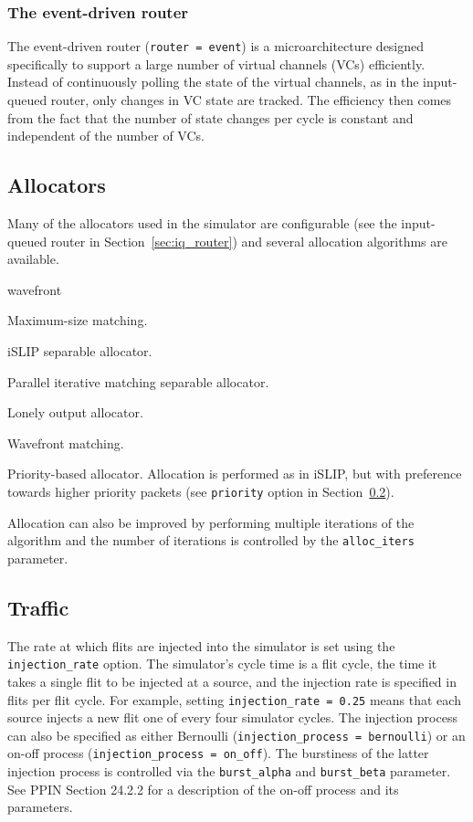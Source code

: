 \documentclass[11pt]{article}
\begin{document}
\subsubsection{The event-driven router}
\label{sec:event_router}

The event-driven router (\texttt{router = event}) is a
microarchitecture designed specifically to support a large number of
virtual channels (VCs) efficiently.  Instead of continuously polling
the state of the virtual channels, as in the input-queued router, only
changes in VC state are tracked.  The efficiency then comes from the
fact that the number of state changes per cycle is constant and
independent of the number of VCs.

\subsection{Allocators}
\label{sec:alloc}

Many of the allocators used in the simulator are configurable (see
the input-queued router in Section~\ref{sec:iq_router}) and several
allocation algorithms are available.
\begin{opt_list}{wavefront}

\item[max\_size] Maximum-size matching. 
\item[islip] iSLIP separable allocator.
\item[pim] Parallel iterative matching separable allocator.
\item[loa] Lonely output allocator.
\item[wavefront] Wavefront matching.
\item[select] Priority-based allocator.  Allocation is performed as in
iSLIP, but with preference towards higher priority packets (see
\texttt{priority} option in Section~\ref{sec:traffic}).

\end{opt_list}

Allocation can also be improved by performing multiple iterations of
the algorithm and the number of iterations is controlled by the
\texttt{alloc\_iters} parameter.

\subsection{Traffic}
\label{sec:traffic}

The rate at which flits are injected into the simulator is set using
the \texttt{injection\_rate} option.  The simulator's cycle time is a
flit cycle, the time it takes a single flit to be injected at a
source, and the injection rate is specified in flits per flit cycle.
For example, setting \texttt{injection\_rate = 0.25} means that each
source injects a new flit one of every four simulator cycles.  The
injection process can also be specified as either Bernoulli
(\texttt{injection\_process = bernoulli}) or an on-off process
(\texttt{injection\_process = on\_off}).  The burstiness of the latter
injection process is controlled via the \texttt{burst\_alpha} and
\texttt{burst\_beta} parameter.  See PPIN Section 24.2.2 for a
description of the on-off process and its parameters.
\end{document}

